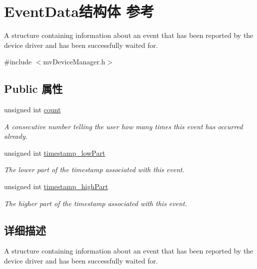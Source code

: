 \hypertarget{struct_event_data}{\section{Event\+Data结构体 参考}
\label{struct_event_data}
}


A structure containing information about an event that has been reported by the device driver and has been successfully waited for.  




{\ttfamily \#include $<$mv\+Device\+Manager.\+h$>$}

\subsection*{Public 属性}
\begin{DoxyCompactItemize}
\item 
\hypertarget{struct_event_data_a9fb758bd922a71dfb5757f2ecb66d417}{unsigned int \hyperlink{struct_event_data_a9fb758bd922a71dfb5757f2ecb66d417}{count}}\label{struct_event_data_a9fb758bd922a71dfb5757f2ecb66d417}

\begin{DoxyCompactList}\small\item\em A consecutive number telling the user how many times this event has occurred already. \end{DoxyCompactList}\item 
\hypertarget{struct_event_data_aaef7a7a2a08abbc0d4b953436159ea42}{unsigned int \hyperlink{struct_event_data_aaef7a7a2a08abbc0d4b953436159ea42}{timestamp\+\_\+low\+Part}}\label{struct_event_data_aaef7a7a2a08abbc0d4b953436159ea42}

\begin{DoxyCompactList}\small\item\em The lower part of the timestamp associated with this event. \end{DoxyCompactList}\item 
unsigned int \hyperlink{struct_event_data_ac643d73ddbad0bf59dc98edd3b7b478c}{timestamp\+\_\+high\+Part}
\begin{DoxyCompactList}\small\item\em The higher part of the timestamp associated with this event. \end{DoxyCompactList}\end{DoxyCompactItemize}


\subsection{详细描述}
A structure containing information about an event that has been reported by the device driver and has been successfully waited for. 

